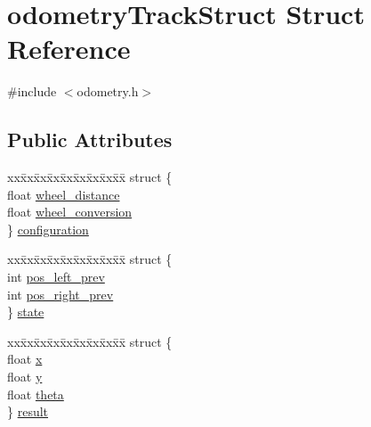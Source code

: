 \hypertarget{structodometry_track_struct}{\section{odometry\+Track\+Struct Struct Reference}
\label{structodometry_track_struct}
}


{\ttfamily \#include $<$odometry.\+h$>$}

\subsection*{Public Attributes}
\begin{DoxyCompactItemize}
\item 
\begin{tabbing}
xx\=xx\=xx\=xx\=xx\=xx\=xx\=xx\=xx\=\kill
struct \{\\
\>float \hyperlink{structodometry_track_struct_aa55d1ec5b8ff6be1bb1a1466d879dff1}{wheel\_distance}\\
\>float \hyperlink{structodometry_track_struct_ac3f7dc5064208631a6d34b4884c01878}{wheel\_conversion}\\
\} \hyperlink{structodometry_track_struct_aa6bba4d091ae45c6fc7cd65a0ae60f5c}{configuration}\\

\end{tabbing}\item 
\begin{tabbing}
xx\=xx\=xx\=xx\=xx\=xx\=xx\=xx\=xx\=\kill
struct \{\\
\>int \hyperlink{structodometry_track_struct_a239492167b9c9189a749caba8f4bba24}{pos\_left\_prev}\\
\>int \hyperlink{structodometry_track_struct_a20071e254af74994c28ef0973c9b449e}{pos\_right\_prev}\\
\} \hyperlink{structodometry_track_struct_a0f7db49f1ec200c715fb59380a0fbd12}{state}\\

\end{tabbing}\item 
\begin{tabbing}
xx\=xx\=xx\=xx\=xx\=xx\=xx\=xx\=xx\=\kill
struct \{\\
\>float \hyperlink{structodometry_track_struct_ae84a00f7b288f12e403e2cece293578e}{x}\\
\>float \hyperlink{structodometry_track_struct_a4fe013b85dc8b7571a00f1d38ecf9b07}{y}\\
\>float \hyperlink{structodometry_track_struct_ab8dc2c81d24c45777cdbec8e72a23565}{theta}\\
\} \hyperlink{structodometry_track_struct_a95e39426ad6235eba90f1fd135a5db06}{result}\\

\end{tabbing}\end{DoxyCompactItemize}



